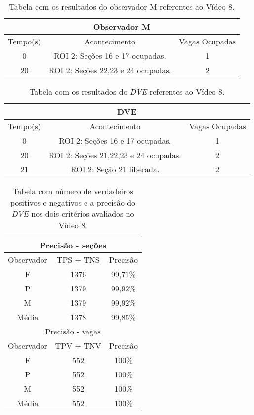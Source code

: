 \begin{table}[H]
\begin{center}
\begin{tabular}{|c||c||c|}
\hline
\multicolumn{3}{|c|}{Observador M}  \\ \hline \hline
Tempo(s) & Acontecimento & Vagas Ocupadas\\ \hline
0 & ROI 2: Seções 16 e 17 ocupadas. & 1 \\ \hline
20 & ROI 2: Seções 22,23 e 24 ocupadas. & 2 \\
\hline
\end{tabular}
\end{center}
\caption{Tabela com os resultados do observador M referentes ao Vídeo 8.}
\label{tab:video8M}
\end{table}


\begin{table}[H]
\begin{center}
\begin{tabular}{|c||c||c|}
\hline
\multicolumn{3}{|c|}{DVE}  \\ \hline \hline
Tempo(s) & Acontecimento & Vagas Ocupadas\\ \hline
0 & ROI 2: Seções 16 e 17 ocupadas. & 1 \\ \hline
20 & ROI 2: Seções 21,22,23 e 24 ocupadas. & 2 \\ \hline
21 & ROI 2: Seção 21 liberada. & 2 \\
\hline
\end{tabular}
\end{center}
\caption{Tabela com os resultados do \textit{DVE} referentes ao Vídeo 8.}
\label{tab:video8}
\end{table}

\begin{table}[H]
\begin{center}
\begin{tabular}{|c||c||c|}
\hline
\multicolumn{3}{|c|}{Precisão - seções}  \\ \hline\hline
Observador & TPS + TNS & Precisão \\ \hline
F & 1376 & 99,71\% \\  \hline
P & 1379 & 99,92\% \\ \hline
M & 1379 & 99,92\% \\ \hline
Média & 1378 & 99,85\% \\
\hline
\hline
\multicolumn{3}{|c|}{Precisão - vagas}  \\ \hline \hline
Observador & TPV + TNV & Precisão \\ \hline
F & 552 & 100\% \\  \hline
P & 552 & 100\% \\ \hline
M & 552 & 100\% \\ \hline
Média & 552 & 100\% \\
\hline
\end{tabular}
\end{center}
\caption{Tabela com número de verdadeiros positivos e negativos e a precisão do \textit{DVE} nos dois 
critérios avaliados no Vídeo 8.}
\label{tab:rvideo8}
\end{table}

